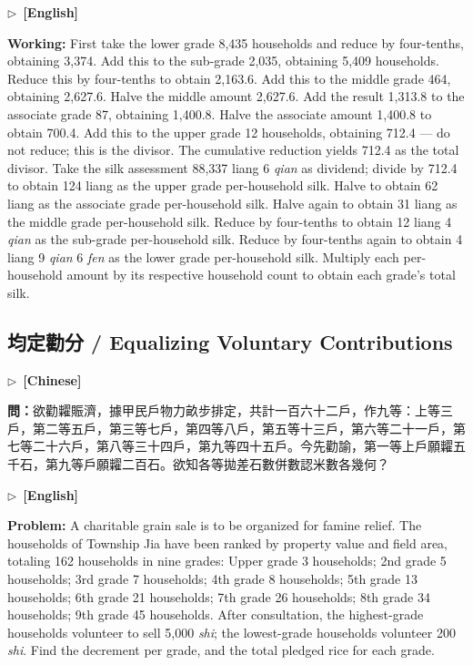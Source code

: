 \documentclass[10pt,a4paper]{article}
\newcommand{\CNmarker}{\noindent\textcolor{cnlabel}{$\triangleright$\ \textbf{[Chinese]}}\par}
\newcommand{\ENmarker}{\noindent\textcolor{enlabel}{$\triangleright$\ \textbf{[English]}}\par}
\newcommand{\Question}[1]{\par\noindent\textbf{\color{problemcolor}問：}#1\par}
\newcommand{\QuestionEn}[1]{\par\noindent\textbf{\color{problemcolor}Problem:} #1\par}
\newcommand{\WorkingEn}[1]{\par\noindent\textbf{\color{workingcolor}Working:} #1\par}
\begin{document}
\ENmarker
\WorkingEn{First take the lower grade 8,435 households and reduce by four-tenths, obtaining 3,374. Add this to the sub-grade 2,035, obtaining 5,409 households. Reduce this by four-tenths to obtain 2,163.6. Add this to the middle grade 464, obtaining 2,627.6. Halve the middle amount 2,627.6. Add the result 1,313.8 to the associate grade 87, obtaining 1,400.8. Halve the associate amount 1,400.8 to obtain 700.4. Add this to the upper grade 12 households, obtaining 712.4 --- do not reduce; this is the divisor. The cumulative reduction yields 712.4 as the total divisor. Take the silk assessment 88,337 liang 6 \textit{qian} as dividend; divide by 712.4 to obtain 124 liang as the upper grade per-household silk. Halve to obtain 62 liang as the associate grade per-household silk. Halve again to obtain 31 liang as the middle grade per-household silk. Reduce by four-tenths to obtain 12 liang 4 \textit{qian} as the sub-grade per-household silk. Reduce by four-tenths again to obtain 4 liang 9 \textit{qian} 6 \textit{fen} as the lower grade per-household silk. Multiply each per-household amount by its respective household count to obtain each grade's total silk.}


\newpage
\subsection*{均定勸分 / Equalizing Voluntary Contributions}

\CNmarker
\Question{欲勸糶賑濟，據甲民戶物力畝步排定，共計一百六十二戶，作九等：上等三戶，第二等五戶，第三等七戶，第四等八戶，第五等十三戶，第六等二十一戶，第七等二十六戶，第八等三十四戶，第九等四十五戶。今先勸諭，第一等上戶願糶五千石，第九等戶願糶二百石。欲知各等拋差石數併數認米數各幾何？}

\ENmarker
\QuestionEn{A charitable grain sale is to be organized for famine relief. The households of Township Jia have been ranked by property value and field area, totaling 162 households in nine grades: Upper grade 3 households; 2nd grade 5 households; 3rd grade 7 households; 4th grade 8 households; 5th grade 13 households; 6th grade 21 households; 7th grade 26 households; 8th grade 34 households; 9th grade 45 households. After consultation, the highest-grade households volunteer to sell 5,000 \textit{shi}; the lowest-grade households volunteer 200 \textit{shi}. Find the decrement per grade, and the total pledged rice for each grade.}
\end{document}
